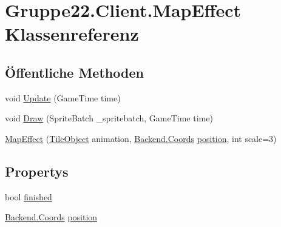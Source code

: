\hypertarget{class_gruppe22_1_1_client_1_1_map_effect}{\section{Gruppe22.\-Client.\-Map\-Effect Klassenreferenz}
\label{class_gruppe22_1_1_client_1_1_map_effect}
}
\subsection*{Öffentliche Methoden}
\begin{DoxyCompactItemize}
\item 
void \hyperlink{class_gruppe22_1_1_client_1_1_map_effect_a732cf42e12724f6b1600574ef951c1b6}{Update} (Game\-Time time)
\item 
void \hyperlink{class_gruppe22_1_1_client_1_1_map_effect_ab274378376c536b1d4ae220baa4f9ad3}{Draw} (Sprite\-Batch \-\_\-spritebatch, Game\-Time time)
\item 
\hyperlink{class_gruppe22_1_1_client_1_1_map_effect_ad536e96e36456fc4ef817284d2eb422e}{Map\-Effect} (\hyperlink{class_gruppe22_1_1_client_1_1_tile_object}{Tile\-Object} animation, \hyperlink{class_gruppe22_1_1_backend_1_1_coords}{Backend.\-Coords} \hyperlink{class_gruppe22_1_1_client_1_1_map_effect_a90edccf3148b277ee39d5a94f545ebba}{position}, int scale=3)
\end{DoxyCompactItemize}
\subsection*{Propertys}
\begin{DoxyCompactItemize}
\item 
bool \hyperlink{class_gruppe22_1_1_client_1_1_map_effect_acb43080240a1dd98c8d0d42cc10d835a}{finished}
\item 
\hyperlink{class_gruppe22_1_1_backend_1_1_coords}{Backend.\-Coords} \hyperlink{class_gruppe22_1_1_client_1_1_map_effect_a90edccf3148b277ee39d5a94f545ebba}{position}
\end{DoxyCompactItemize}


